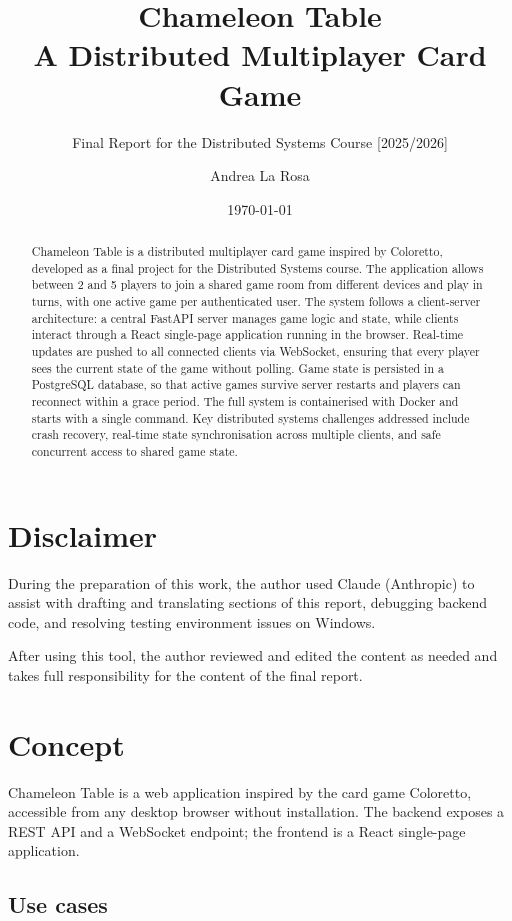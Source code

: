 \documentclass{scrartcl}
\title{\LARGE
    Chameleon Table\\
    A Distributed Multiplayer Card Game
}
\subtitle{Final Report for the Distributed Systems Course [2025/2026]}
\author{
    Andrea La Rosa \\ \emailaddr{andrea.larosa2@studio.unibo.it}
}
\date{\today}
\begin{document}
\maketitle

\begin{abstract}
Chameleon Table is a distributed multiplayer card game inspired by Coloretto,
developed as a final project for the Distributed Systems course. 
The application allows between 2 and 5 players to join a shared 
game room from different devices and play in turns, with one active
game per authenticated user. The system follows a client-server architecture:
a central FastAPI server manages game logic and state, while clients interact
through a React single-page application running in the browser.
Real-time updates are pushed to all connected clients via WebSocket,
ensuring that every player sees the current state of the game without polling.
Game state is persisted in a PostgreSQL database, so that active games
survive server restarts and players can reconnect within a grace period.
The full system is containerised with Docker and starts with a single command.
Key distributed systems challenges addressed include crash recovery,
real-time state synchronisation across multiple clients,
and safe concurrent access to shared game state.
\end{abstract}

\section*{Disclaimer}

During the preparation of this work, the author used Claude (Anthropic) to assist
with drafting and translating sections of this report, debugging backend code,
and resolving testing environment issues on Windows.

After using this tool, the author reviewed and edited the content as needed
and takes full responsibility for the content of the final report.

\section{Concept}\label{concept}

Chameleon Table is a web application inspired by the card game Coloretto,
accessible from any desktop browser without installation.
The backend exposes a REST API and a WebSocket endpoint;
the frontend is a React single-page application.

\subsection*{Use cases}
\end{document}
